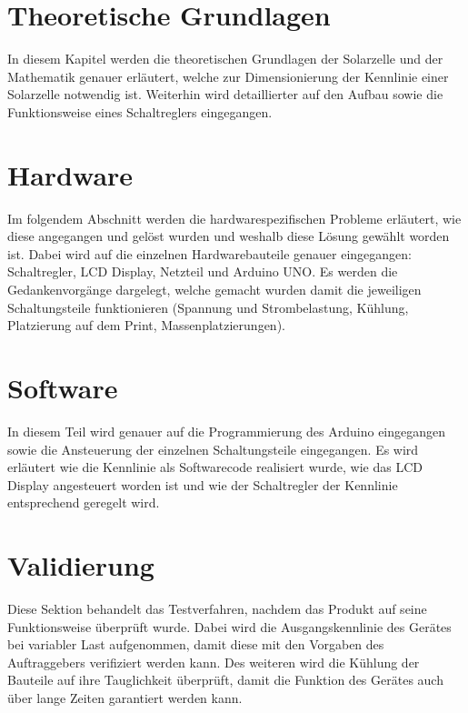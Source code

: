 \documentclass[a4paper]{fhnwreport} %
\begin{document}
\section{Theoretische Grundlagen}

In diesem Kapitel werden die theoretischen Grundlagen der Solarzelle und der Mathematik genauer erläutert, welche zur Dimensionierung der Kennlinie einer Solarzelle notwendig ist. Weiterhin wird detaillierter auf den Aufbau sowie die Funktionsweise eines Schaltreglers eingegangen. 

\section{Hardware} 

Im folgendem Abschnitt werden die hardwarespezifischen Probleme erläutert, wie diese angegangen und gelöst wurden und weshalb diese Lösung gewählt worden ist. Dabei wird auf die einzelnen Hardwarebauteile genauer eingegangen: Schaltregler, LCD Display, Netzteil und Arduino UNO. Es werden die Gedankenvorgänge dargelegt, welche gemacht wurden damit die jeweiligen Schaltungsteile funktionieren (Spannung und Strombelastung, Kühlung, Platzierung auf dem Print, Massenplatzierungen).

\section{Software}

In diesem Teil wird genauer auf die Programmierung des Arduino eingegangen sowie die Ansteuerung der einzelnen Schaltungsteile eingegangen. Es wird erläutert wie die Kennlinie als Softwarecode realisiert wurde, wie das LCD Display angesteuert worden ist und wie der Schaltregler der Kennlinie entsprechend geregelt wird. 

\section{Validierung}

Diese Sektion behandelt das Testverfahren, nachdem das Produkt auf seine Funktionsweise überprüft wurde. Dabei wird die Ausgangskennlinie des Gerätes bei variabler Last aufgenommen, damit diese mit den Vorgaben des Auftraggebers verifiziert werden kann. Des weiteren wird die Kühlung der Bauteile auf ihre Tauglichkeit überprüft, damit die Funktion des Gerätes auch über lange Zeiten garantiert werden kann. 
\end{document}
